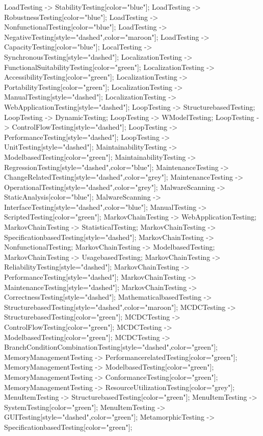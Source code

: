 \documentclass{article}
\begin{document}
{LoadTesting -> StabilityTesting[color="blue"];
LoadTesting -> RobustnessTesting[color="blue"];
LoadTesting -> NonfunctionalTesting[color="blue"];
LoadTesting -> NegativeTesting[style="dashed",color="maroon"];
LoadTesting -> CapacityTesting[color="blue"];
LocalTesting -> SynchronousTesting[style="dashed"];
LocalizationTesting -> FunctionalSuitabilityTesting[color="green"];
LocalizationTesting -> AccessibilityTesting[color="green"];
LocalizationTesting -> PortabilityTesting[color="green"];
LocalizationTesting -> ManualTesting[style="dashed"];
LocalizationTesting -> WebApplicationTesting[style="dashed"];
LoopTesting -> StructurebasedTesting;
LoopTesting -> DynamicTesting;
LoopTesting -> WModelTesting;
LoopTesting -> ControlFlowTesting[style="dashed"];
LoopTesting -> PerformanceTesting[style="dashed"];
LoopTesting -> UnitTesting[style="dashed"];
MaintainabilityTesting -> ModelbasedTesting[color="green"];
MaintainabilityTesting -> RegressionTesting[style="dashed",color="blue"];
MaintenanceTesting -> ChangeRelatedTesting[style="dashed",color="grey"];
MaintenanceTesting -> OperationalTesting[style="dashed",color="grey"];
MalwareScanning -> StaticAnalysis[color="blue"];
MalwareScanning -> InterfaceTesting[style="dashed",color="blue"];
ManualTesting -> ScriptedTesting[color="green"];
MarkovChainTesting -> WebApplicationTesting;
MarkovChainTesting -> StatisticalTesting;
MarkovChainTesting -> SpecificationbasedTesting[style="dashed"];
MarkovChainTesting -> NonfunctionalTesting;
MarkovChainTesting -> ModelbasedTesting;
MarkovChainTesting -> UsagebasedTesting;
MarkovChainTesting -> ReliabilityTesting[style="dashed"];
MarkovChainTesting -> PerformanceTesting[style="dashed"];
MarkovChainTesting -> MaintenanceTesting[style="dashed"];
MarkovChainTesting -> CorrectnessTesting[style="dashed"];
MathematicalbasedTesting -> StructurebasedTesting[style="dashed",color="maroon"];
MCDCTesting -> StructurebasedTesting[color="green"];
MCDCTesting -> ControlFlowTesting[color="green"];
MCDCTesting -> ModelbasedTesting[color="green"];
MCDCTesting -> BranchConditionCombinationTesting[style="dashed",color="green"];
MemoryManagementTesting -> PerformancerelatedTesting[color="green"];
MemoryManagementTesting -> ModelbasedTesting[color="green"];
MemoryManagementTesting -> ConformanceTesting[color="green"];
MemoryManagementTesting -> ResourceUtilizationTesting[color="grey"];
MenuItemTesting -> StructurebasedTesting[color="green"];
MenuItemTesting -> SystemTesting[color="green"];
MenuItemTesting -> GUITesting[style="dashed",color="green"];
MetamorphicTesting -> SpecificationbasedTesting[color="green"];
}
\end{document}
